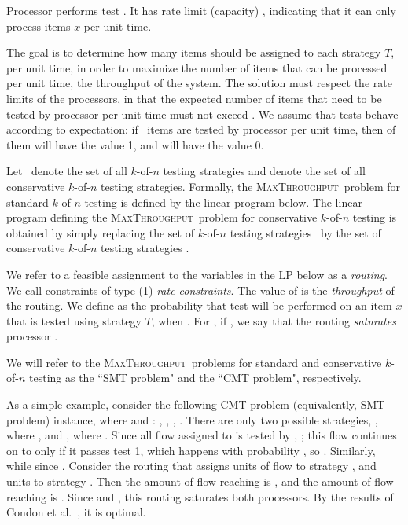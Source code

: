 \documentclass{article}
\newcounter{ass}
\newcommand{\ens}[1]{\ensuremath{#1}}					\newcommand{\card}[1]{\ens{|#1|}}							\newcommand{\dotlist}[2]{\ens{#1,\ldots,#2}}
\newcommand{\anitem}{\ens{x}}
\newcommand{\valn}{\ens{n}}
\newcommand{\valk}{\ens{k}}
\newcommand{\maxthru}{\textsc{MaxThroughput}}
\newcommand{\kofn}{\valk-of-\valn}
\newcommand{\strategy}{\ens{T}}
\newcommand{\processor}{processor}
\newcommand{\Processor}{Processor}
\newcommand{\smt}{\textsf{SMT} problem}				\newcommand{\cmt}{\textsf{CMT} problem}
\begin{document}
{\Processor}  performs test .  It has rate limit (capacity) , indicating
that it can only
process  items \anitem{} per unit time. 


The goal is to determine how many items should be assigned to each strategy \strategy,
per unit time, in order to maximize 
the number of items that can be processed per unit time, the throughput of the system.
The solution must respect the rate limits of the {\processor}s, in that the
expected number of items that need to be tested by {\processor}  per unit time must
not exceed .  
We assume that tests behave according to expectation: if \flowamt\ items
are tested by {\processor}  per unit time, then  of them will have the value 1,
and  will have the value 0.

Let \stratspace\ denote the set of all \kofn{} testing strategies and
 denote the set of all conservative \kofn{} testing strategies. 
Formally, the \maxthru\ problem for standard \kofn{}
testing is defined by the linear program below.
The linear program defining the \maxthru\ problem for conservative \kofn{} testing is obtained 
by simply replacing the set of \kofn{} testing strategies \stratspace\ by the
set of conservative \kofn{} testing strategies .

We refer to a feasible assignment to the variables  in the LP below as a {\em routing}.
We call constraints of type (1) {\em rate constraints}.
The value of  is the {\em throughput} of the routing.
 We define  as the probability that test  will be performed on an item \anitem{} that is tested using strategy \strategy, when .
For , if 
, 
we say that the routing {\em saturates} {\processor} .

We will refer to the \maxthru\ problems for standard and conservative \kofn{} testing as the ``\smt" and the ``\cmt", respectively. 




As a simple example, consider 
the following \cmt{} (equivalently, \smt) instance, 
where  and : , , , .
There are only two possible strategies, , where ,
and , where .  
Since all flow assigned to  is tested by , ; 
this flow continues on to  only if it passes test 1, which happens with probability ,
so .  
Similarly,  while  since .
Consider the routing that assigns
 units of flow to strategy , and  units 
to strategy .  Then the amount of flow reaching  is
, 
and the amount of flow reaching  is
.  Since  and ,
 this routing saturates both {\processor}s.   By the results of Condon et al.~\cite{journals/talg/CondonDHW09}, it is optimal.
 
\end{document}
